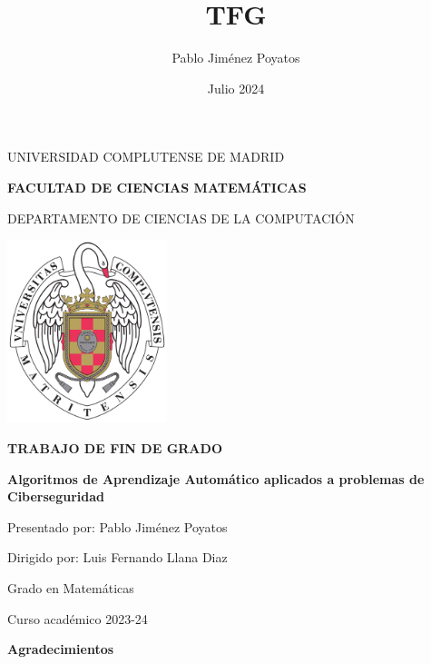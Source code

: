 \documentclass[11pt,a4paper]{book}
\author{Pablo Jiménez Poyatos}
\title{TFG}
\date{Julio 2024}
\begin{document}
\raggedbottom 
{}


\begin{titlepage}
		\centering
		
		{ \Large UNIVERSIDAD COMPLUTENSE DE MADRID}
		
		{ \Large \textbf{FACULTAD DE CIENCIAS MATEMÁTICAS}}
		\vspace{0.8cm}
		
		{ \large DEPARTAMENTO DE CIENCIAS DE LA  COMPUTACIÓN}
		\vspace{1cm}
		
		\vspace{0.6cm}
		
		\graphicspath{ {images/} }
		\includegraphics[width=0.35\textwidth]{img/ucm.png} 
		\vspace{0.4cm}
		
        {\Large \textbf{TRABAJO DE FIN DE GRADO}}
		
		\vspace{8mm}
        {\huge \bfseries Algoritmos de Aprendizaje Automático aplicados a problemas de Ciberseguridad\par}
		\vspace{1cm}

		{\large Presentado por: Pablo Jiménez Poyatos}
		
		{\large Dirigido por: Luis Fernando Llana Diaz}
		
		\vspace{1.5cm}
		{\large Grado en Matemáticas}
		
		{\large Curso académico 2023-24}
\end{titlepage}

\thispagestyle{empty}
\clearpage
\setcounter{page}{1}


\newpage
\begin{center}
   {\bf Agradecimientos} 
\end{center}
\end{document}
